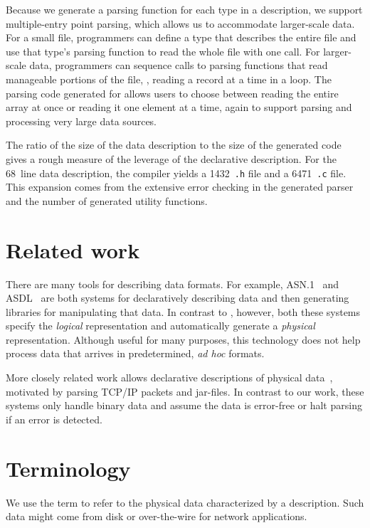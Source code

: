 Because we generate a parsing function for each type in a \pads{} description,
we support multiple-entry point parsing, which allows us to 
accommodate larger-scale data.
For a small file, programmers can define a \pads{} type that describes
the entire file and use that type's parsing function to read the whole
file with one call.  For larger-scale data, programmers can sequence
calls to parsing functions that read manageable portions of the file,
\eg{}, reading a record at a time in a loop.  The parsing code generated
for  allows users to choose between reading the entire array
at once or reading it one element at a time, again to support parsing
and processing very large data sources.

The ratio of the size of the data description to the size of the generated code gives a rough measure of the leverage of the
declarative description.  For the 
68~line \dibbler{} data description, the compiler yields a 1432~\texttt{.h} file
and a 6471~\texttt{.c} file.  This expansion comes from the extensive error checking in the generated parser and the number of generated utility functions.


\section{Related work}
There are many tools for describing data formats. For example,
\textsc{ASN.1}~\cite{asn} and \textsc{ASDL}~\cite{asdl} are both
systems for declaratively describing data and then generating
libraries for manipulating that data.  In contrast to \PADS{},
however, both these systems specify the {\em logical\/} representation
and automatically generate a {\em physical\/} representation.
Although useful for many purposes, this technology does not help
process data that arrives in predetermined, \textit{ad hoc} formats.


More closely related work allows declarative descriptions of physical
data~\cite{sigcomm00,erlang-bit-syntax,gpce02}, motivated by parsing
\textsc{TCP/IP} packets and \java{} jar-files.  In contrast to our
work, these systems only handle binary data and assume the data is
error-free or halt parsing if an error is detected.  

\section{Terminology}
We use the term \textit{\external{}} to refer to the physical
data characterized by a \PADS{} description.  Such data might 
come from disk or over-the-wire for network applications.

